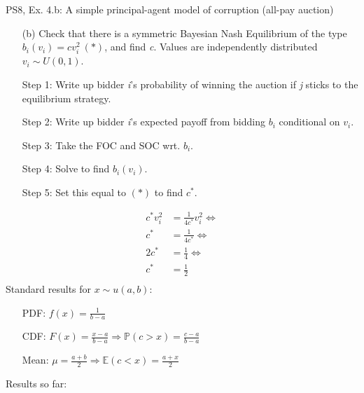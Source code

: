 \begin{frame}{PS8, Ex. 4.b: A simple principal-agent model of corruption (all-pay auction)}
    \begin{itemize}
      \item[(b)] Check that there is a symmetric Bayesian Nash Equilibrium of the type $b_i(v_i) = cv_i^2\ (*)$, and find \textit{c}. Values are independently distributed $v_i\sim U(0, 1)$.
    \end{itemize} \vspace{-8pt}
    \begin{multicols}{2}
      \begin{itemize}
        \item[Step 1:] Write up bidder \textit{i}'s probability of winning the auction if \textit{j} sticks to the equilibrium strategy.
        \item[Step 2:] Write up bidder \textit{i}'s expected payoff from bidding $b_i$ conditional on $v_i$.
        \item[Step 3:] Take the FOC and SOC wrt. $b_i$.
        \item[Step 4:] Solve to find $b_i(v_i)$.
        \item[Step 5:] Set this equal to $(*)$ to find $c^*$.
      \end{itemize} \vspace{-6pt}
      \begin{align*}
        c^*v_i^2&=\frac{1}{4c^*}v_i^2\Leftrightarrow\\
        c^*&=\frac{1}{4c^*}\Leftrightarrow\\
        2c^*&=\frac{1}{4}\Leftrightarrow\\
        c^*&=\frac{1}{2}\\
      \end{align*}
      \vfill\null\columnbreak
      Standard results for $x\sim u(a, b):$ \vspace{-6pt}
      \begin{itemize}
        \item[PDF:] $f(x)=\frac{1}{b-a}$
        \item[CDF:] $F(x)=\frac{x-a}{b-a}\Rightarrow\mathbb{P}(c>x)=\frac{c-a}{b-a}$
        \item[Mean:] $\mu=\frac{a+b}{2}\Rightarrow\mathbb{E}(c<x)=\frac{a+x}{2}$
      \end{itemize}
      \vspace{-6pt}
      Results so far: \vspace{-6pt}
      \begin{align*}

\end{align*}
\end{multicols}
\end{frame}
